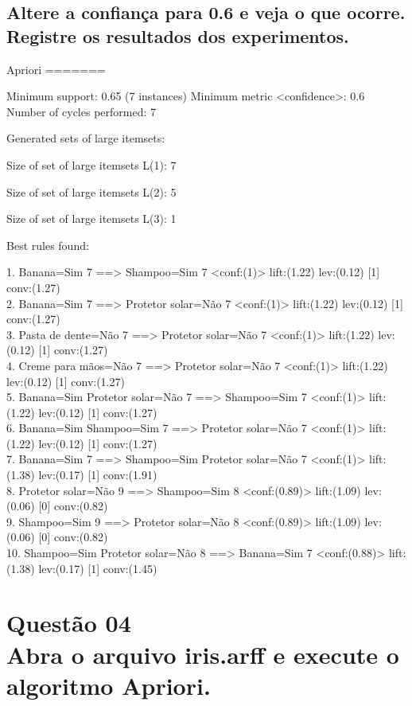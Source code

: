 \documentclass[12pt]{article}
\begin{document}
\subsection{Altere a confiança para 0.6 e veja o que ocorre. Registre os resultados dos experimentos.}
Apriori
=======

Minimum support: 0.65 (7 instances)
Minimum metric <confidence>: 0.6
Number of cycles performed: 7

Generated sets of large itemsets:

Size of set of large itemsets L(1): 7

Size of set of large itemsets L(2): 5

Size of set of large itemsets L(3): 1

Best rules found:

 1. Banana=Sim 7 ==>  Shampoo=Sim 7    <conf:(1)> lift:(1.22) lev:(0.12) [1] conv:(1.27)\\
 2. Banana=Sim 7 ==>  Protetor solar=Não 7    <conf:(1)> lift:(1.22) lev:(0.12) [1] conv:(1.27)\\
 3.  Pasta de dente=Não 7 ==>  Protetor solar=Não 7    <conf:(1)> lift:(1.22) lev:(0.12) [1] conv:(1.27)\\
 4.  Creme para mãos=Não 7 ==>  Protetor solar=Não 7    <conf:(1)> lift:(1.22) lev:(0.12) [1] conv:(1.27)\\
 5. Banana=Sim  Protetor solar=Não 7 ==>  Shampoo=Sim 7    <conf:(1)> lift:(1.22) lev:(0.12) [1] conv:(1.27)\\
 6. Banana=Sim  Shampoo=Sim 7 ==>  Protetor solar=Não 7    <conf:(1)> lift:(1.22) lev:(0.12) [1] conv:(1.27)\\
 7. Banana=Sim 7 ==>  Shampoo=Sim  Protetor solar=Não 7    <conf:(1)> lift:(1.38) lev:(0.17) [1] conv:(1.91)\\
 8.  Protetor solar=Não 9 ==>  Shampoo=Sim 8    <conf:(0.89)> lift:(1.09) lev:(0.06) [0] conv:(0.82)\\
 9.  Shampoo=Sim 9 ==>  Protetor solar=Não 8    <conf:(0.89)> lift:(1.09) lev:(0.06) [0] conv:(0.82)\\
10.  Shampoo=Sim  Protetor solar=Não 8 ==> Banana=Sim 7    <conf:(0.88)> lift:(1.38) lev:(0.17) [1] conv:(1.45)\\


\section{Questão 04\\
  Abra o arquivo iris.arff e execute o algoritmo Apriori.
 }
\end{document}
